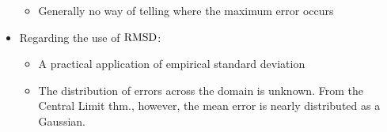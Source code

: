 \begin{framed}
\begin{itemize}
\begin{itemize}
                        \item Generally no way of telling where the maximum error occurs
                \end{itemize}
                \item Regarding the use of $\operatorname{RMSD}$:
                    \begin{itemize}
                        \item A practical application of empirical standard deviation
                            \item The distribution of errors across the domain is unknown. From the Central Limit thm., however,
                                the mean error is nearly distributed as a Gaussian.
                    \end{itemize}
    \end{itemize}
\end{framed}
